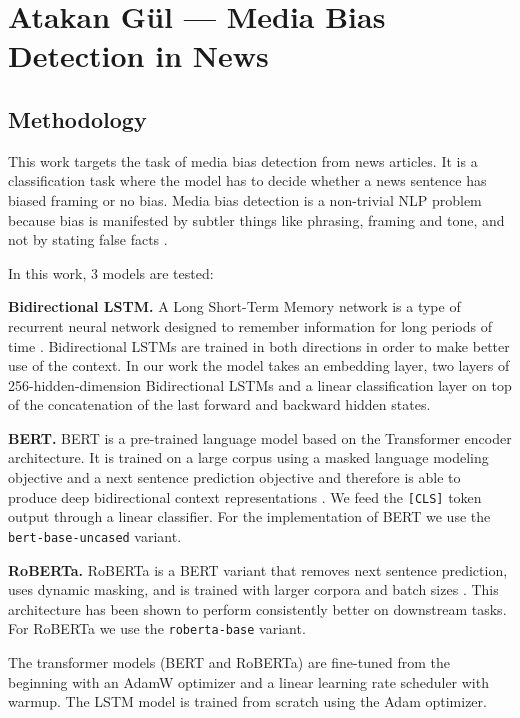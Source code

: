 \documentclass[a4paper,12pt]{report}
\begin{document}
\chapter{Atakan G\"{u}l --- Media Bias Detection in News}

\section{Methodology}

This work targets the task of media bias detection from news articles. It is a classification task where the model has to decide whether a news sentence has biased framing or no bias. Media bias detection is a non-trivial NLP problem because bias is manifested by subtler things like phrasing, framing and tone, and not by stating false facts \cite{hamborg2019}.

In this work, 3 models are tested:

\textbf{Bidirectional LSTM.} A Long Short-Term Memory network is a type of recurrent neural network designed to remember information for long periods of time \cite{hochreiter1997}. Bidirectional LSTMs are trained in both directions in order to make better use of the context. In our work the model takes an embedding layer, two layers of 256-hidden-dimension Bidirectional LSTMs and a linear classification layer on top of the concatenation of the last forward and backward hidden states.

\textbf{BERT.} BERT is a pre-trained language model based on the Transformer encoder architecture. It is trained on a large corpus using a masked language modeling objective and a next sentence prediction objective and therefore is able to produce deep bidirectional context representations \cite{devlin2019}. We feed the \texttt{[CLS]} token output through a linear classifier. For the implementation of BERT we use the \texttt{bert-base-uncased} variant.

\textbf{RoBERTa.} RoBERTa is a BERT variant that removes next sentence prediction, uses dynamic masking, and is trained with larger corpora and batch sizes \cite{liu2019}. This architecture has been shown to perform consistently better on downstream tasks. For RoBERTa we use the \texttt{roberta-base} variant.

The transformer models (BERT and RoBERTa) are fine-tuned from the beginning with an AdamW optimizer and a linear learning rate scheduler with warmup. The LSTM model is trained from scratch using the Adam optimizer.
\end{document}
